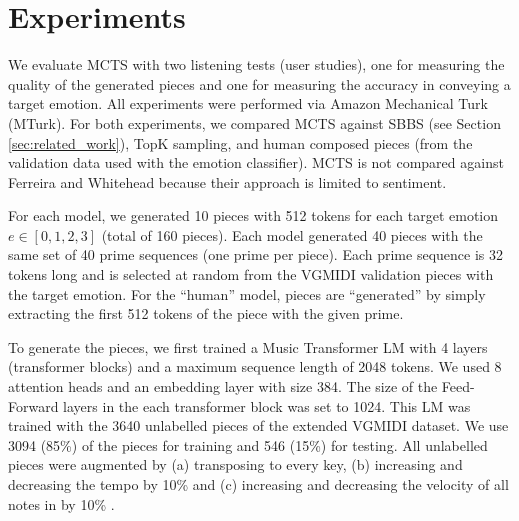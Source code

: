 %
%
%
%
%
%
%

\section{Experiments}

We evaluate MCTS with two listening tests (user studies), one for measuring the quality of the generated pieces and one for measuring the accuracy in conveying a target emotion. All experiments were performed via Amazon Mechanical Turk (MTurk). For both experiments,
we compared MCTS against SBBS (see Section \ref{sec:related_work}), TopK sampling, and human composed pieces (from the validation data used with the emotion classifier).
MCTS is not compared against Ferreira and Whitehead \cite{ferreira_2019} because their approach is limited to sentiment.

For each model, we generated 10 pieces with 512 tokens for each target emotion $e \in [0, 1, 2, 3]$ (total of 160 pieces). Each model generated 40 pieces with the same set of 40 prime sequences (one prime per piece). Each prime sequence is 32 tokens long and is selected at random from the VGMIDI validation pieces with the target emotion. For the ``human'' model, pieces are ``generated'' by simply extracting the first 512 tokens of the piece with the given prime.

To generate the pieces, we first trained a Music Transformer LM with 4 layers (transformer blocks) and a maximum sequence length of 2048 tokens. We used 8 attention heads and an embedding layer with size 384. The size of the Feed-Forward layers in the each transformer block was set to 1024. This
LM was trained with the 3640 unlabelled pieces of the extended VGMIDI dataset. We use 3094 (85\%) of the pieces for training and 546 (15\%) for testing.
All unlabelled pieces were augmented by (a) transposing to every key, (b)
increasing and decreasing the tempo by 10\% and (c) increasing and decreasing
the velocity of all notes in by 10\% \cite{oore2017learning}.

